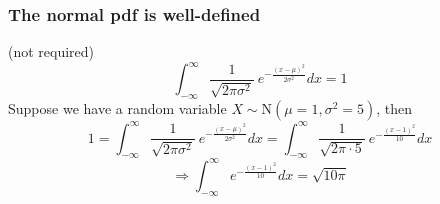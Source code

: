 \documentclass[slidestop,compress,mathserif]{beamer}
\begin{document}
\begin{frame}\frametitle{The normal pdf is well-defined} %
({\color{red}not required})
\[\int_{-\infty}^\infty \frac{1}{\sqrt{2\pi\sigma^2}}~e^{ -\frac{(x-\mu)^2}{2\sigma^2} } dx =1 \]
\pause
Suppose we have a random variable $X \sim \text{N}(\mu = 1, \sigma^2 = 5)$, then
\[
1  = \int_{-\infty}^\infty \frac{1}{\sqrt{2\pi\sigma^2}}~e^{ -\frac{(x-\mu)^2}{2\sigma^2} } dx
 = \int_{-\infty}^{\infty} \frac{1}{\sqrt{2 \pi \cdot 5}}~e^{-\frac{(x -1)^2}{10}}dx\]
 \pause
 \[\Longrightarrow \int_{-\infty}^{\infty} e^{-\frac{(x -1)^2}{10}}dx = \sqrt{10\pi}\]


%





\end{frame}




\end{document}
